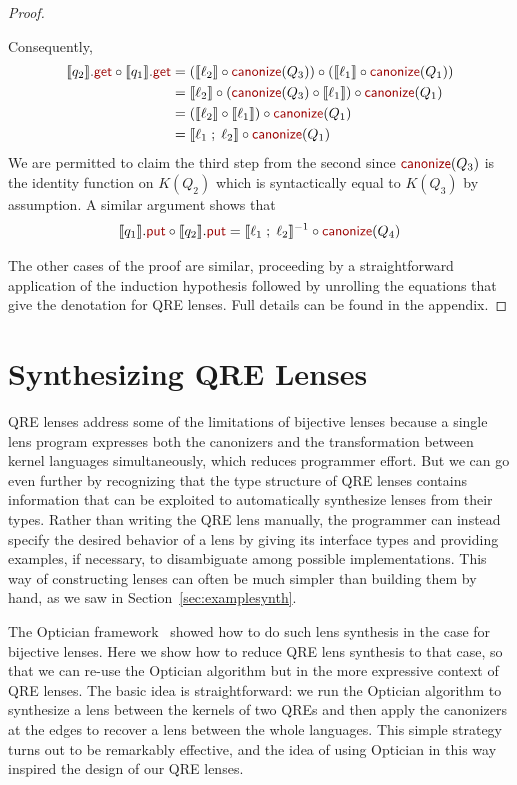 \documentclass[acmsmall,review,anonymous]{acmart}
\newcommand{\kw}[1]{\textcolor{dkred}{\ensuremath{\mathsf{#1}}}}
\newcommand{\canonize}{\ensuremath{\kw{canonize}}}
\newcommand{\get}{\ensuremath{\kw{get}}}
\newcommand{\lput}{\ensuremath{\kw{put}}}
\begin{document}
\begin{proof}
\begin{center}
\end{center}
%
Consequently,
\begin{align*}
\llbracket q_2 \rrbracket.\get \circ \llbracket q_1 \rrbracket.\get &=
(\llbracket \ell_2 \rrbracket \circ \canonize(Q_3)) \circ (\llbracket \ell_1
\rrbracket \circ \canonize(Q_1))\\
&= \llbracket \ell_2 \rrbracket \circ (\canonize(Q_3) \circ \llbracket \ell_1
\rrbracket) \circ \canonize(Q_1)\\
&= (\llbracket \ell_2 \rrbracket \circ \llbracket \ell_1 \rrbracket) \circ
\canonize(Q_1)\\
&= \llbracket \ell_1 \; ; \; \ell_2 \rrbracket \circ \canonize(Q_1)
\end{align*}
We are permitted to claim the third step from the second since
$\canonize(Q_3)$ is the identity function on $K(Q_2)$ which is
syntactically equal to $K(Q_3)$ by assumption. A similar argument shows that
$$\llbracket q_1 \rrbracket.\lput \circ \llbracket q_2 \rrbracket.\lput =
\llbracket \ell_1 \; ; \; \ell_2 \rrbracket^{-1} \circ
\canonize(Q_4)$$

The other cases of the proof are similar, proceeding by a
straightforward application of the induction hypothesis followed by unrolling
the equations that give the denotation for QRE lenses.  Full details can be
found in the appendix.
\end{proof}

\section{Synthesizing QRE Lenses}
\label{synth}

QRE lenses address some of the limitations of bijective lenses because a single
lens program expresses both the canonizers and the transformation between kernel
languages simultaneously, which reduces programmer effort.  But we can go even
further by recognizing that the type structure of QRE lenses contains
information that can be exploited to automatically synthesize lenses from their
types.  Rather than writing the QRE lens manually, the programmer can instead
specify the desired behavior of a lens by giving its interface types and providing
examples, if necessary, to disambiguate among possible implementations.  This
way of constructing lenses can often be much simpler than building them by
hand, as we saw in Section~\ref{sec:examplesynth}.

The Optician framework~\cite{optician} showed how to do such lens synthesis in
the case for bijective lenses. Here we show how to reduce QRE lens synthesis to
that case, so that we can re-use the Optician algorithm but in the more
expressive context of QRE lenses.  The basic idea is straightforward: we run the
Optician algorithm to synthesize a lens between the kernels of two QREs and then
apply the canonizers at the edges to recover a lens between the whole
languages.  This simple strategy turns out to be remarkably effective, and the
idea of using Optician in this way inspired the design of our QRE lenses.  
\end{document}
